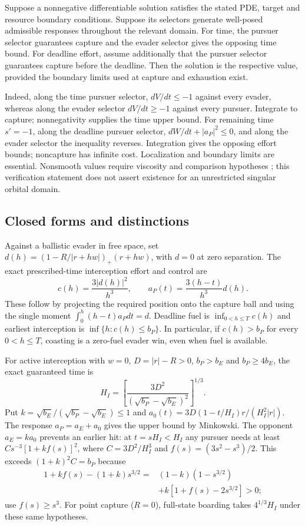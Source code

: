 \begin{proposition}
Suppose a nonnegative differentiable solution satisfies the stated PDE,
target and resource boundary conditions. Suppose its selectors generate
well-posed admissible responses throughout the relevant domain. For time,
the pursuer selector guarantees capture and the evader selector gives the
opposing time bound. For deadline effort, assume additionally that the
pursuer selector guarantees capture before the deadline. Then the solution
is the respective value, provided the boundary limits used at capture
and exhaustion exist.
\end{proposition}
Indeed, along the time pursuer selector, $dV/dt\le-1$ against every
evader, whereas along the evader selector $dV/dt\ge-1$ against every
pursuer. Integrate to capture; nonnegativity supplies the time upper
bound. For remaining time $s'= -1$, along the deadline pursuer selector,
$dW/dt+|a_P|^2\le0$, and along the evader selector the inequality reverses.
Integration gives the opposing effort bounds; noncapture has infinite
cost. Localization and boundary limits are essential. Nonsmooth values
require viscosity and comparison hypotheses \cite{EvansSouganidis1984};
this verification statement does not assert existence for an unrestricted
singular orbital domain.

\subsection{Closed forms and distinctions}
Against a ballistic evader in free space, set
$d(h)=(1-R/|r+hw|)_+(r+hw)$, with $d=0$ at zero separation. The exact
prescribed-time interception effort and control are
\begin{equation}
 c(h)=\frac{3|d(h)|^2}{h^3},\qquad a_P(t)=\frac{3(h-t)}{h^3}d(h).
\end{equation}
These follow by projecting the required position onto the capture ball
and using the single moment $\int_0^h(h-t)a_Pdt=d$. Deadline fuel is
$\inf_{0<h\le T}c(h)$ and earliest interception is
$\inf\{h:c(h)\le b_P\}$. In particular, if $c(h)>b_P$ for every
$0<h\le T$, coasting is a zero-fuel evader win, even when fuel is available.

For active interception with $w=0$, $D=|r|-R>0$, $b_P>b_E$ and
$b_P\ge4b_E$, the exact guaranteed time is
\begin{equation}
 H_I=\left[\frac{3D^2}{(\sqrt{b_P}-\sqrt{b_E})^2}\right]^{1/3}.
\end{equation}
Put $k=\sqrt{b_E}/(\sqrt{b_P}-\sqrt{b_E})\le1$ and
$a_0(t)=3D(1-t/H_I)r/(H_I^2|r|)$. The response $a_P=a_E+a_0$
gives the upper bound by Minkowski. The opponent $a_E=ka_0$ prevents an
earlier hit: at $t=sH_I< H_I$ any pursuer needs at least
$C s^{-3}[1+kf(s)]^2$, where $C=3D^2/H_I^3$ and
$f(s)=(3s^2-s^3)/2$. This exceeds $(1+k)^2C=b_P$ because
\[
\begin{split}
1+kf(s)-(1+k)s^{3/2}
={}&(1-k)(1-s^{3/2})\\
 &+k[1+f(s)-2s^{3/2}]>0;
\end{split}
\]
use $f(s)\ge s^3$. For point capture ($R=0$), full-state boarding takes
$4^{1/3}H_I$ under these same hypotheses.

